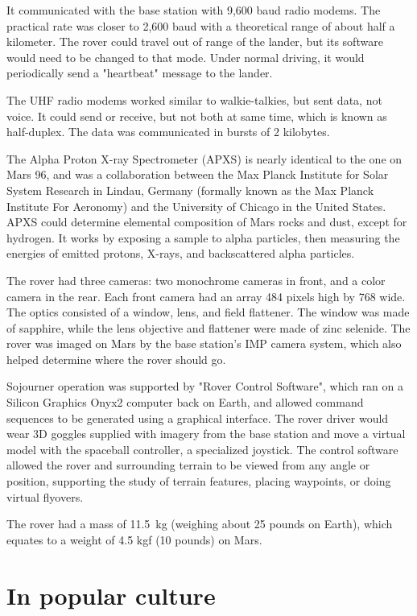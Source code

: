It communicated with the base station with 9,600 baud radio modems. The
practical rate was closer to 2,600 baud with a theoretical range of
about half a kilometer. The rover could travel out of range of the
lander, but its software would need to be changed to that mode. Under
normal driving, it would periodically send a "heartbeat" message to the
lander.

The UHF radio modems worked similar to walkie-talkies, but sent data,
not voice. It could send or receive, but not both at same time, which is
known as half-duplex. The data was communicated in bursts of 2
kilobytes.

The Alpha Proton X-ray Spectrometer (APXS) is nearly identical to the
one on Mars 96, and was a collaboration between the Max Planck Institute
for Solar System Research in Lindau, Germany (formally known as the Max
Planck Institute For Aeronomy) and the University of Chicago in the
United States. APXS could determine elemental composition of Mars rocks
and dust, except for hydrogen. It works by exposing a sample to alpha
particles, then measuring the energies of emitted protons, X-rays, and
backscattered alpha particles.

The rover had three cameras: two monochrome cameras in front, and a
color camera in the rear. Each front camera had an array 484 pixels high
by 768 wide. The optics consisted of a window, lens, and field
flattener. The window was made of sapphire, while the lens objective and
flattener were made of zinc selenide. The rover was imaged on Mars by
the base station's IMP camera system, which also helped determine where
the rover should go.

Sojourner operation was supported by "Rover Control Software", which ran
on a Silicon Graphics Onyx2 computer back on Earth, and allowed command
sequences to be generated using a graphical interface. The rover driver
would wear 3D goggles supplied with imagery from the base station and
move a virtual model with the spaceball controller, a specialized
joystick. The control software allowed the rover and surrounding terrain
to be viewed from any angle or position, supporting the study of terrain
features, placing waypoints, or doing virtual flyovers.

The rover had a mass of 11.5~kg (weighing about 25 pounds on Earth),
which equates to a weight of 4.5 kgf (10 pounds) on Mars.

\section{In popular culture}\label{in-popular-culture}

